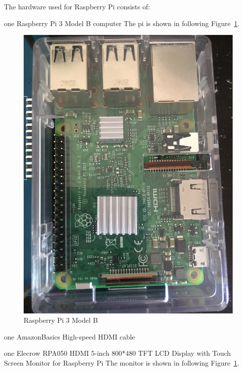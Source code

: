 The hardware used for Raspberry Pi consists of: 

one Raspberry Pi 3 Model B computer
The pi is shown in following Figure~\ref{f:fly}.

\begin{figure}[!ht]
  \centering\includegraphics[width=\columnwidth]{images/pi.jpeg}
  \caption{Raspberry Pi 3 Model B}\label{f:fly}
\end{figure}


one AmazonBasics High-speed HDMI cable

one Elecrow RPA050 HDMI 5-inch 800*480 TFT LCD Display with Touch
 Screen Monitor for Raspberry Pi
 The monitor is shown in following Figure~\ref{f:fly}.

